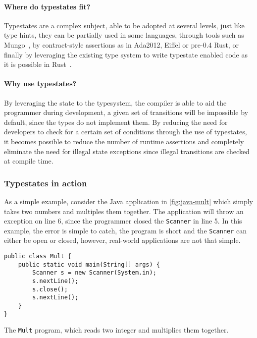\paragraph{Where do typestates fit?}
Typestates are a complex subject, able to be adopted at several levels,
just like type hints, they can be partially used in some languages,
through tools such as Mungo~\autocite{Voinea2020},
by contract-style assertions as in Ada2012, Eiffel or pre-0.4 Rust,
or finally by leveraging the existing type system to write typestate enabled code as it is possible in
Rust~\autocite{Duarte2020}.

\paragraph{Why use typestates?}
By leveraging the state to the typesystem, the compiler is able to aid the programmer during development,
a given set of transitions will be impossible by default, since the types do not implement them. %
By reducing the need for developers to check for a certain set of conditions through the use of typestates,
it becomes possible to reduce the number of runtime assertions and
completely eliminate the need for illegal state exceptions since illegal transitions are checked at compile time.


\subsubsection*{Typestates in action}

As a simple example, consider the Java application in \autoref{fig:java-mult} which simply takes two numbers and multiples them together.
The application will throw an exception on line 6,
since the programmer closed the \texttt{Scanner} in line 5.
In this example, the error is simple to catch,
the program is short and the \texttt{Scanner} can either be open or closed,
however, real-world applications are not that simple.

\begin{listing}
    \centering
    \begin{verbatim}
public class Mult {
    public static void main(String[] args) {
        Scanner s = new Scanner(System.in);
        s.nextLine();
        s.close();
        s.nextLine();
    }
}
    \end{verbatim}
    \caption{The \texttt{Mult} program, which reads two integer and multiplies them together.}
    \label{fig:java-mult}
\end{listing}

